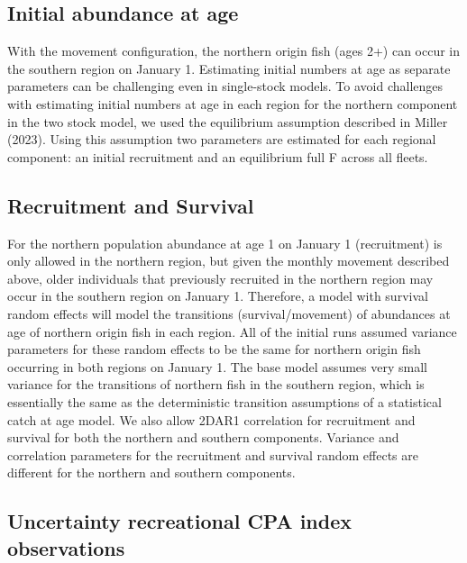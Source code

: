 \documentclass[
]{article}
\begin{document}
\hypertarget{initial-abundance-at-age}{%
\subsection{Initial abundance at age}\label{initial-abundance-at-age}}

With the movement configuration, the northern origin fish (ages 2+) can occur in the southern region on January 1. Estimating initial numbers at age as separate parameters can be challenging even in single-stock models. To avoid challenges with estimating initial numbers at age in each region for the northern component in the two stock model, we used the equilibrium assumption described in Miller (2023). Using this assumption two parameters are estimated for each regional component: an initial recruitment and an equilibrium full F across all fleets.

\hypertarget{recruitment-and-survival}{%
\subsection{Recruitment and Survival}\label{recruitment-and-survival}}

For the northern population abundance at age 1 on January 1 (recruitment) is only allowed in the northern region, but given the monthly movement described above, older individuals that previously recruited in the northern region may occur in the southern region on January 1. Therefore, a model with survival random effects will model the transitions (survival/movement) of abundances at age of northern origin fish in each region. All of the initial runs assumed variance parameters for these random effects to be the same for northern origin fish occurring in both regions on January 1. The base model assumes very small variance for the transitions of northern fish in the southern region, which is essentially the same as the deterministic transition assumptions of a statistical catch at age model. We also allow 2DAR1 correlation for recruitment and survival for both the northern and southern components. Variance and correlation parameters for the recruitment and survival random effects are different for the northern and southern components.

\hypertarget{uncertainty-recreational-cpa-index-observations}{%
\subsection{Uncertainty recreational CPA index observations}\label{uncertainty-recreational-cpa-index-observations}}
\end{document}
